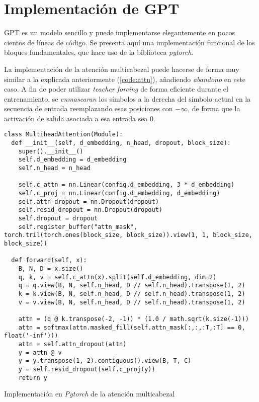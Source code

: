 \chapter{Implementación de GPT} \label{appendixA}
GPT es un modelo sencillo y puede implementarse elegantemente en pocos cientos de líneas de código. Se presenta aquí una implementación funcional de los bloques fundamentales, que hace uso de la biblioteca \textit{pytorch}.

La implementación de la atención multicabezal puede hacerse de forma muy similar a la explicada anteriormente (\cref{code:attn}), añadiendo \textit{abandono} en este caso. A fin de poder utilizar \textit{teacher forcing} de forma eficiente durante el entrenamiento, se \textit{enmascaran} los símbolos a la derecha del símbolo actual en la secuencia de entrada reemplazando esas posiciones con \( -\infty \), de forma que la activación de salida asociada a esa entrada sea \( 0 \).

\begin{code}
\begin{verbatim}
class MultiheadAttention(Module):
  def __init__(self, d_embedding, n_head, dropout, block_size):
    super().__init__()
    self.d_embedding = d_embedding
    self.n_head = n_head

    self.c_attn = nn.Linear(config.d_embedding, 3 * d_embedding)
    self.c_proj = nn.Linear(config.d_embedding, d_embedding)
    self.attn_dropout = nn.Dropout(dropout)
    self.resid_dropout = nn.Dropout(dropout)
    self.dropout = dropout
    self.register_buffer("attn_mask", torch.tril(torch.ones(block_size, block_size)).view(1, 1, block_size, block_size))

  def forward(self, x):
    B, N, D = x.size()
    q, k, v = self.c_attn(x).split(self.d_embedding, dim=2)
    q = q.view(B, N, self.n_head, D // self.n_head).transpose(1, 2)
    k = k.view(B, N, self.n_head, D // self.n_head).transpose(1, 2)
    v = v.view(B, N, self.n_head, D // self.n_head).transpose(1, 2)

    attn = (q @ k.transpose(-2, -1)) * (1.0 / math.sqrt(k.size(-1)))
    attn = softmax(attn.masked_fill(self.attn_mask[:,:,:T,:T] == 0, float('-inf')))
    attn = self.attn_dropout(attn)
    y = attn @ v
    y = y.transpose(1, 2).contiguous().view(B, T, C)
    y = self.resid_dropout(self.c_proj(y))
    return y
\end{verbatim}
\caption{Implementación en \textit{Pytorch} de la atención multicabezal}
\label{code:attn}
\end{code}

